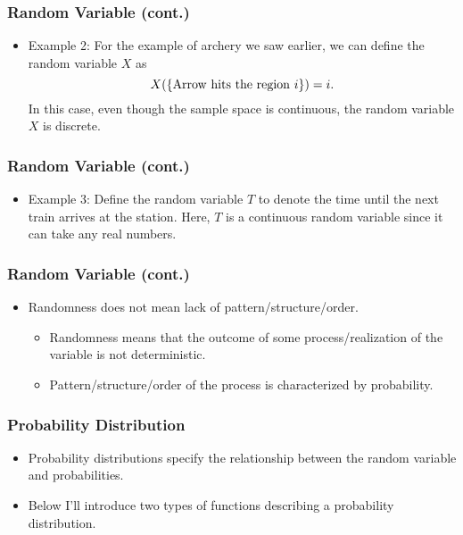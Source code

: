 \documentclass[pdflatex, 12pt]{beamer}
\begin{document}
\begin{frame}
\frametitle{Random Variable (cont.)}
\begin{itemize}
\item Example 2: For the example of archery we saw earlier, we can define the random variable $X$ as 
 \begin{equation}
 X(\left\{\mathrm{Arrow \ hits \ the \ region \ }i\right\}) = i. \notag
 \end{equation}
In this case, even though the sample space is continuous, the random variable $X$ is discrete.
\end{itemize}
\end{frame}

\begin{frame}
\frametitle{Random Variable (cont.)}
\begin{itemize}
\item Example 3: Define the random variable $T$ to denote the time until the next train arrives at the station. Here, $T$ is a continuous random variable since it can take any real numbers.
\end{itemize}
\end{frame}

\begin{frame}
\frametitle{Random Variable (cont.)}
\begin{itemize}
\item Randomness does not mean lack of pattern/structure/order.
 \begin{itemize}
 \item Randomness means that the outcome of some process/realization of the variable is not deterministic.
 \item Pattern/structure/order of the process is characterized by probability.
 \end{itemize}
\end{itemize}
\end{frame}

\begin{frame}
\frametitle{Probability Distribution}
\begin{itemize}
\item Probability distributions specify the relationship between the random variable and probabilities.
\vspace{0.4cm}
\item Below I'll introduce two types of functions describing a probability distribution.  
\end{itemize}
\end{frame}
\end{document}
